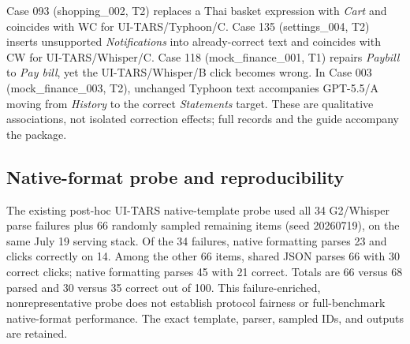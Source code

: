 Case 093 (shopping\_002, T2) replaces a Thai basket expression with \emph{Cart} and coincides with WC for UI-TARS/Typhoon/C. Case 135 (settings\_004, T2) inserts unsupported \emph{Notifications} into already-correct text and coincides with CW for UI-TARS/Whisper/C. Case 118 (mock\_finance\_001, T1) repairs \emph{Paybill} to \emph{Pay bill}, yet the UI-TARS/Whisper/B click becomes wrong. In Case 003 (mock\_finance\_003, T2), unchanged Typhoon text accompanies GPT-5.5/A moving from \emph{History} to the correct \emph{Statements} target. These are qualitative associations, not isolated correction effects; full records and the guide accompany the package.

\subsection{Native-format probe and reproducibility}

The existing post-hoc UI-TARS native-template probe used all 34 G2/Whisper parse failures plus 66 randomly sampled remaining items (seed 20260719), on the same July 19 serving stack. Of the 34 failures, native formatting parses 23 and clicks correctly on 14. Among the other 66 items, shared JSON parses 66 with 30 correct clicks; native formatting parses 45 with 21 correct. Totals are 66 versus 68 parsed and 30 versus 35 correct out of 100. This failure-enriched, nonrepresentative probe does not establish protocol fairness or full-benchmark native-format performance. The exact template, parser, sampled IDs, and outputs are retained.


